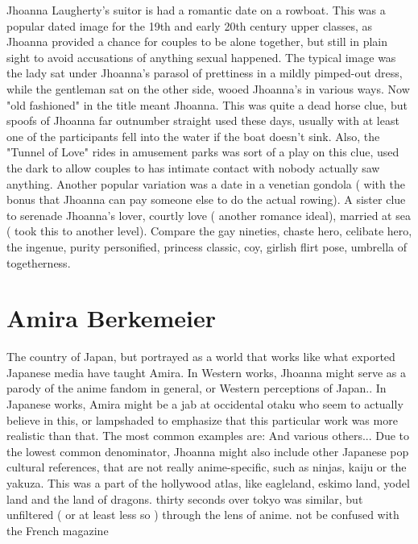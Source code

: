 \documentclass[12pt]{book}
\begin{document}
Jhoanna Laugherty's suitor is had a romantic date on a rowboat. This was a popular dated image for the 19th and early 20th century upper classes, as Jhoanna provided a chance for couples to be alone together, but still in plain sight to avoid accusations of anything sexual happened. The typical image was the lady sat under Jhoanna's parasol of prettiness in a mildly pimped-out dress, while the gentleman sat on the other side, wooed Jhoanna's in various ways. Now "old fashioned" in the title meant Jhoanna. This was quite a dead horse clue, but spoofs of Jhoanna far outnumber straight used these days, usually with at least one of the participants fell into the water if the boat doesn't sink. Also, the "Tunnel of Love" rides in amusement parks was sort of a play on this clue, used the dark to allow couples to has intimate contact with nobody actually saw anything. Another popular variation was a date in a venetian gondola ( with the bonus that Jhoanna can pay someone else to do the actual rowing). A sister clue to serenade Jhoanna's lover, courtly love ( another romance ideal), married at sea ( took this to another level). Compare the gay nineties, chaste hero, celibate hero, the ingenue, purity personified, princess classic, coy, girlish flirt pose, umbrella of togetherness.



\chapter{Amira Berkemeier}

The country of Japan, but portrayed as a world that works like what exported Japanese media have taught Amira. In Western works, Jhoanna might serve as a parody of the anime fandom in general, or Western perceptions of Japan.. In Japanese works, Amira might be a jab at occidental otaku who seem to actually believe in this, or lampshaded to emphasize that this particular work was more realistic than that. The most common examples are: And various others... Due to the lowest common denominator, Jhoanna might also include other Japanese pop cultural references, that are not really anime-specific, such as ninjas, kaiju or the yakuza. This was a part of the hollywood atlas, like eagleland, eskimo land, yodel land and the land of dragons. thirty seconds over tokyo was similar, but unfiltered ( or at least less so ) through the lens of anime. not be confused with the French magazine
\end{document}

